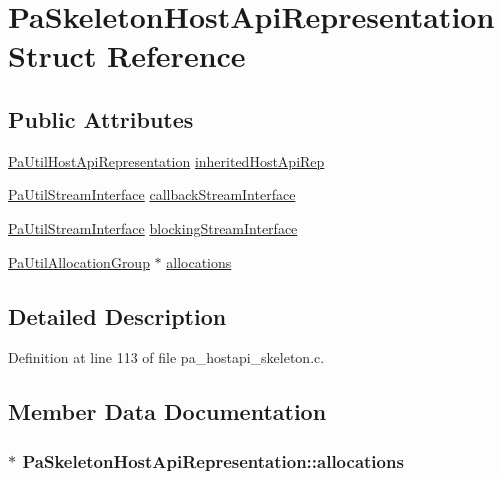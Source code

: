 \hypertarget{struct_pa_skeleton_host_api_representation}{}\section{Pa\+Skeleton\+Host\+Api\+Representation Struct Reference}
\label{struct_pa_skeleton_host_api_representation}
\subsection*{Public Attributes}
\begin{DoxyCompactItemize}
\item 
\hyperlink{struct_pa_util_host_api_representation}{Pa\+Util\+Host\+Api\+Representation} \hyperlink{struct_pa_skeleton_host_api_representation_a3ec480f69783358b33c2aacd7fd6c5de}{inherited\+Host\+Api\+Rep}
\item 
\hyperlink{struct_pa_util_stream_interface}{Pa\+Util\+Stream\+Interface} \hyperlink{struct_pa_skeleton_host_api_representation_ae06becb0e8e6a0d5014d6d8530d66051}{callback\+Stream\+Interface}
\item 
\hyperlink{struct_pa_util_stream_interface}{Pa\+Util\+Stream\+Interface} \hyperlink{struct_pa_skeleton_host_api_representation_adef5e514ad78efef79811721e50db7c5}{blocking\+Stream\+Interface}
\item 
\hyperlink{struct_pa_util_allocation_group}{Pa\+Util\+Allocation\+Group} $\ast$ \hyperlink{struct_pa_skeleton_host_api_representation_ac1033481bf0cea429626061021d3e37f}{allocations}
\end{DoxyCompactItemize}


\subsection{Detailed Description}


Definition at line 113 of file pa\+\_\+hostapi\+\_\+skeleton.\+c.



\subsection{Member Data Documentation}
\subsubsection[{\texorpdfstring{allocations}{allocations}}]{$\ast$ Pa\+Skeleton\+Host\+Api\+Representation\+::allocations}\hypertarget{struct_pa_skeleton_host_api_representation_ac1033481bf0cea429626061021d3e37f}{}\label{struct_pa_skeleton_host_api_representation_ac1033481bf0cea429626061021d3e37f}


